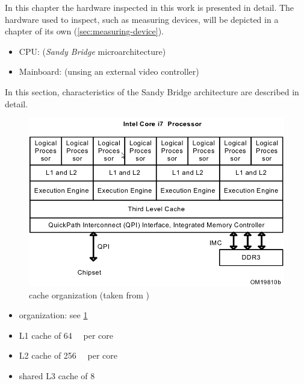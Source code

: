 \label{sec:technical-prerequisites}

In this chapter the hardware inspected in this work is presented in detail. The
hardware used to inspect, such as measuring devices, will be depicted in a
chapter of its own (\ref{sec:measuring-device}).

\label{sec:hw-products}

\begin{itemize}

\item CPU: \JWPcpu (\emph{Sandy Bridge}\cite{wiki:snb} microarchitecture)

\item Mainboard: \JWPboard (unsing an external video controller)

\end{itemize}


\label{sec:sandy-bridge}

In this section, characteristics of the Sandy Bridge architecture are described
in detail.

\begin{figure}
  \centering
    \includegraphics[width=\textwidth]{fig/intel-cache-orga.png}
  \caption{\JWPcpu cache organization (taken from \cite{intel2011softdev})}
  \label{fig:cache-orga}
\end{figure}



\begin{itemize}

\item organization: see \ref{fig:cache-orga}

\item L1 cache of \SI{64}{\kibi\byte} per core\cite{intel2011softdev}

\item L2 cache of \SI{256}{\kibi\byte} per core\cite{intel2011softdev}

\item shared L3 cache of \SI{8}{\mebi\byte}\cite{intel2011softdev}

\end{itemize}


